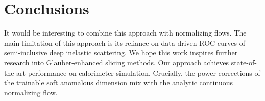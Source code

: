 \section{Conclusions}\label{sec:conclusions}

It would be interesting to combine this approach with normalizing flows.
The main limitation of this approach is its reliance on data-driven ROC
curves of semi-inclusive deep inelastic scattering. We hope this work
inspires further research into Glauber-enhanced slicing methods. Our
approach achieves state-of-the-art performance on calorimeter
simulation. Crucially, the power corrections of the trainable soft
anomalous dimension mix with the analytic continuous normalizing flow.

